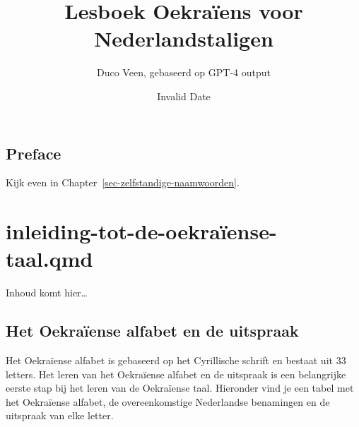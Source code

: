 \documentclass[
  letterpaper,
  DIV=11,
  numbers=noendperiod]{scrreprt}
\title{Lesboek Oekraïens voor Nederlandstaligen}
\author{Duco Veen, gebaseerd op GPT-4 output}
\date{Invalid Date}
\renewcommand*\contentsname{Table of contents}
\newcommand\contentsname{Table of contents}
\begin{document}
\maketitle
\ifdefined\Shaded\renewenvironment{Shaded}{\begin{tcolorbox}[boxrule=0pt, sharp corners, frame hidden, interior hidden, enhanced, borderline west={3pt}{0pt}{shadecolor}, breakable]}{\end{tcolorbox}}\fi

\renewcommand*\contentsname{Table of contents}
{
\hypersetup{linkcolor=}
\setcounter{tocdepth}{2}
\tableofcontents
}

\hypertarget{preface}{%
\chapter*{Preface}\label{preface}}


Kijk even in Chapter~\ref{sec-zelfstandige-naamwoorden}.

\part{inleiding-tot-de-oekraïense-taal.qmd}

Inhoud komt hier\ldots{}

\hypertarget{het-oekrauxefense-alfabet-en-de-uitspraak}{%
\chapter{Het Oekraïense alfabet en de
uitspraak}\label{het-oekrauxefense-alfabet-en-de-uitspraak}}

Het Oekraïense alfabet is gebaseerd op het Cyrillische schrift en
bestaat uit 33 letters. Het leren van het Oekraïense alfabet en de
uitspraak is een belangrijke eerste stap bij het leren van de Oekraïense
taal. Hieronder vind je een tabel met het Oekraïense alfabet, de
overeenkomstige Nederlandse benamingen en de uitspraak van elke letter.
\end{document}
